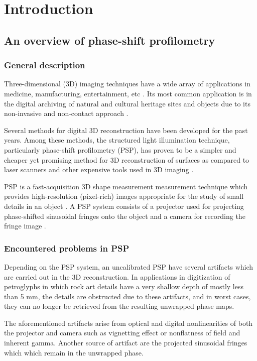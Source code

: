 \chapter{Introduction}

\section{An overview of phase-shift profilometry}
\subsection{General description}

Three-dimensional (3D) imaging techniques have a wide array of applications in medicine, manufacturing, entertainment, etc \cite{}. 
Its most common application is in the digital archiving of natural and cultural heritage sites and objects due to its non-invasive and non-contact approach \cite{Simon2013}. 

Several methods for digital 3D reconstruction have been developed for the past years. Among these methods, the structured light illumination technique, particularly phase-shift profilometry (PSP), has proven to be a simpler and cheaper yet promising method for 3D reconstruction of surfaces as compared to laser scanners and other expensive tools used in 3D imaging \cite{Zhang2002, Chrova200x}. 

PSP is a fast-acquisition 3D shape measurement measurement technique which provides high-resolution (pixel-rich) images appropriate for the study of small details in an object \cite{}. 
A PSP system consists of a projector used for projecting phase-shifted sinusoidal fringes onto the object and a camera for recording the fringe image \cite{}. 

\subsection{Encountered problems in PSP}

Depending on the PSP system, an uncalibrated PSP have several artifacts which are carried out in the 3D reconstruction. 
In applications in digitization of petroglyphs in which rock art details have a very shallow depth of mostly less than 5 mm, the details are obstructed due to these artifacts, and in worst cases, they can no longer be retrieved from the resulting unwrapped phase maps.

The aforementioned artifacts arise from optical and digital nonlinearities of both the projector and camera such as vignetting effect or nonflatness of field and inherent gamma. 
Another source of artifact are the projected sinusoidal fringes which which remain in the unwrapped phase. 

